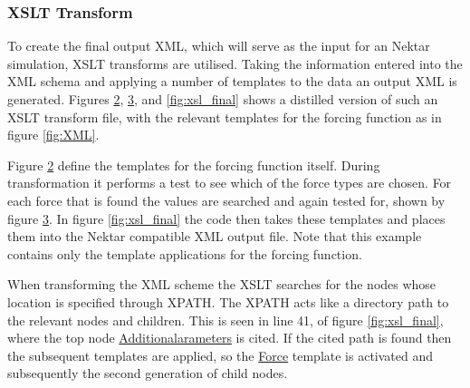 \documentclass[11pt, a4paper]{report}
\begin{document}
\begin{figure}[htb!]
 \centering
 
 \label{fig:custom_type}
\end{figure}

\subsubsection{XSLT Transform}
To create the final output XML, which will serve as the input for an Nektar simulation, XSLT transforms are utilised. Taking the information entered into the XML schema and applying a number of templates to the data an output XML is generated. Figures \ref{fig:xsl_parent}, \ref{fig:xsl_child}, and \ref{fig:xsl_final} shows a distilled version of such an XSLT transform file, with the relevant templates for the forcing function as in figure \ref{fig:XML}.

\begin{figure}[htb!]
 \centering
 
 \label{fig:xsl_parent}
\end{figure}

Figure \ref{fig:xsl_parent} define the templates for the forcing function itself. During transformation it performs a test to see which of the force types are chosen. For each force that is found the values are searched and again tested for, shown by figure \ref{fig:xsl_child}. In figure \ref{fig:xsl_final} the code then takes these templates and places them into the Nektar compatible XML output file. Note that this example contains only the template applications for the forcing function.

\begin{figure}[htb!]
 \centering
 
 \label{fig:xsl_child}
\end{figure}

When transforming the XML scheme the XSLT searches for the nodes whose location is specified through XPATH. The XPATH acts like a directory path to the relevant nodes and children. This is seen in line 41, of figure \ref{fig:xsl_final}, where the top node \url{Additionalarameters} is cited. If the cited path is found then the subsequent templates are applied, so the \url{Force} template is activated and subsequently the second generation of child nodes.
\end{document}
